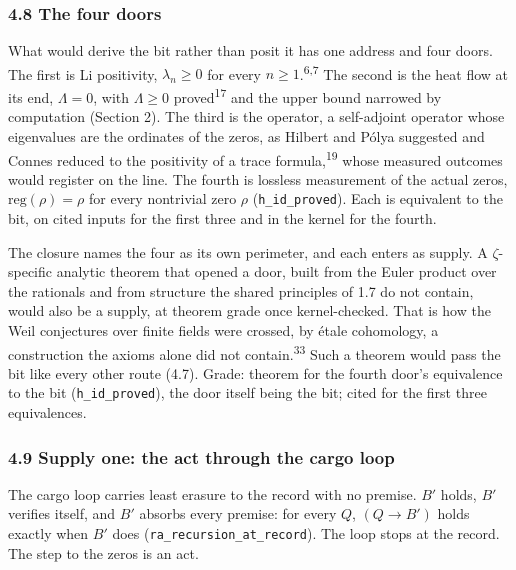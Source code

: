 \documentclass[10pt]{article}
\begin{document}
\hypertarget{the-four-doors}{%
\subsubsection{4.8 The four doors}\label{the-four-doors}}

What would derive the bit rather than posit it has one address and four
doors. The first is Li positivity, \(\lambda_n \ge 0\) for every
\(n \ge 1\).\textsuperscript{6,7} The second is the heat flow at its
end, \(\Lambda = 0\), with \(\Lambda \ge 0\) proved\textsuperscript{17}
and the upper bound narrowed by computation (Section 2). The third is
the operator, a self-adjoint operator whose eigenvalues are the
ordinates of the zeros, as Hilbert and Pólya suggested and Connes
reduced to the positivity of a trace formula,\textsuperscript{19} whose
measured outcomes would register on the line. The fourth is lossless
measurement of the actual zeros, \(\mathrm{reg}(\rho) = \rho\) for every
nontrivial zero \(\rho\)
(\texttt{h\_\allowbreak{}id\_\allowbreak{}proved}). Each is equivalent
to the bit, on cited inputs for the first three and in the kernel for
the fourth.

The closure names the four as its own perimeter, and each enters as
supply. A \(\zeta\)-specific analytic theorem that opened a door, built
from the Euler product over the rationals and from structure the shared
principles of 1.7 do not contain, would also be a supply, at theorem
grade once kernel-checked. That is how the Weil conjectures over finite
fields were crossed, by étale cohomology, a construction the axioms
alone did not contain.\textsuperscript{33} Such a theorem would pass the
bit like every other route (4.7). Grade: theorem for the fourth door's
equivalence to the bit
(\texttt{h\_\allowbreak{}id\_\allowbreak{}proved}), the door itself
being the bit; cited for the first three equivalences.

\hypertarget{supply-one-the-act-through-the-cargo-loop}{%
\subsubsection{4.9 Supply one: the act through the cargo
loop}\label{supply-one-the-act-through-the-cargo-loop}}

The cargo loop carries least erasure to the record with no premise.
\(B'\) holds, \(B'\) verifies itself, and \(B'\) absorbs every premise:
for every \(Q\), \((Q \to B')\) holds exactly when \(B'\) does
(\texttt{ra\_\allowbreak{}recursion\_\allowbreak{}at\_\allowbreak{}record}).
The loop stops at the record. The step to the zeros is an act.
\end{document}
